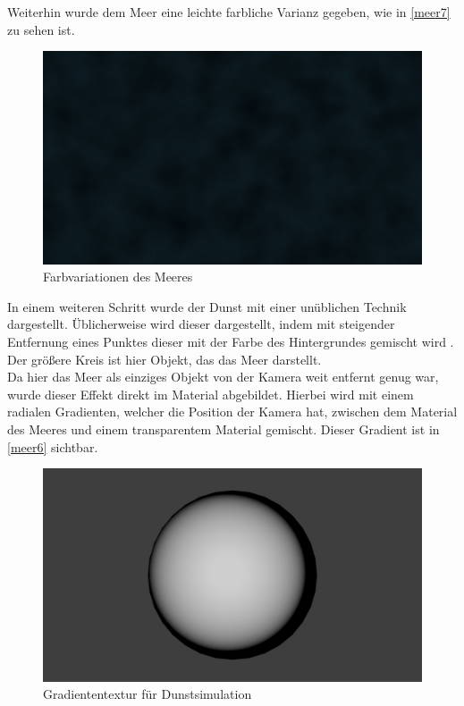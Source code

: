Weiterhin wurde dem Meer eine leichte farbliche Varianz gegeben, wie in \autoref{meer7} zu sehen ist.

\begin{figure}[H]
\includegraphics[width=\textwidth]{gfx/prod/ocean/meer7.jpg}
\caption{Farbvariationen des Meeres}
\label{meer7}
\end{figure}

In einem weiteren Schritt wurde der Dunst mit einer unüblichen Technik dargestellt. Üblicherweise wird dieser dargestellt, indem mit steigender Entfernung eines Punktes dieser mit der Farbe des Hintergrundes gemischt wird . Der größere Kreis ist hier Objekt, das das Meer darstellt.\\
Da hier das Meer als einziges Objekt von der Kamera weit entfernt genug war, wurde dieser Effekt direkt im Material abgebildet. Hierbei wird mit einem radialen Gradienten, welcher die Position der Kamera hat, zwischen dem Material des Meeres und einem transparentem Material gemischt. Dieser Gradient ist in \autoref{meer6} sichtbar.

\begin{figure}[H]
\includegraphics[width=\textwidth]{gfx/prod/ocean/meer6.jpg}
\caption{Gradiententextur für Dunstsimulation}
\label{meer6}
\end{figure}

